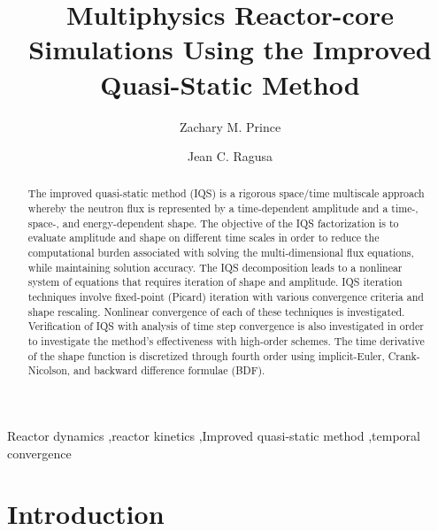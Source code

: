 \documentclass{elsarticle}
\begin{document}
\begin{frontmatter}


\title{Multiphysics Reactor-core Simulations Using the Improved Quasi-Static Method}


\author[tamu]{Zachary M. Prince}

\author[tamu]{Jean C. Ragusa}

\address[tamu]{Texas A\&M University,
  Department of Nuclear Engineering,
  College Station, TX 77840, USA}

\begin{abstract}
The improved quasi-static method (IQS) is a rigorous space/time multiscale approach whereby the neutron flux is represented by a time-dependent amplitude and a time-, space-, and energy-dependent shape. The objective of the IQS factorization is to evaluate amplitude and shape on different time scales in order to reduce the computational burden associated with solving the multi-dimensional flux equations, while maintaining solution accuracy. The IQS decomposition leads to a nonlinear system of equations that requires iteration of shape and amplitude. IQS iteration techniques involve fixed-point (Picard) iteration with various convergence criteria and shape rescaling. Nonlinear convergence of each of these techniques is investigated. Verification of IQS with analysis of time step convergence is also investigated in order to investigate the method's effectiveness with high-order schemes. The time derivative of the shape function is discretized through fourth order using implicit-Euler, Crank-Nicolson, and backward difference formulae (BDF).
\end{abstract}

\begin{keyword}
Reactor dynamics \sep reactor kinetics \sep Improved quasi-static method \sep temporal convergence 
\end{keyword}

\end{frontmatter}


\section{Introduction}
\end{document}
